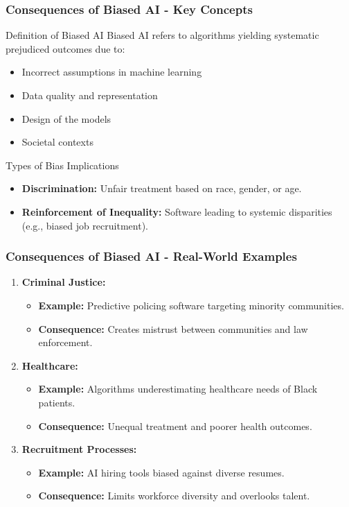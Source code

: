 \documentclass[aspectratio=169]{beamer}
\begin{document}
\begin{frame}[fragile]
    \frametitle{Consequences of Biased AI - Key Concepts}
    \begin{block}{Definition of Biased AI}
        Biased AI refers to algorithms yielding systematic prejudiced outcomes due to:
        \begin{itemize}
            \item Incorrect assumptions in machine learning
            \item Data quality and representation
            \item Design of the models
            \item Societal contexts
        \end{itemize}
    \end{block}
    
    \begin{block}{Types of Bias Implications}
        \begin{itemize}
            \item \textbf{Discrimination:} Unfair treatment based on race, gender, or age.
            \item \textbf{Reinforcement of Inequality:} Software leading to systemic disparities (e.g., biased job recruitment).
        \end{itemize}
    \end{block}
\end{frame}

\begin{frame}[fragile]
    \frametitle{Consequences of Biased AI - Real-World Examples}
    \begin{enumerate}
        \item \textbf{Criminal Justice:}
            \begin{itemize}
                \item \textbf{Example:} Predictive policing software targeting minority communities.
                \item \textbf{Consequence:} Creates mistrust between communities and law enforcement.
            \end{itemize}
        \item \textbf{Healthcare:}
            \begin{itemize}
                \item \textbf{Example:} Algorithms underestimating healthcare needs of Black patients.
                \item \textbf{Consequence:} Unequal treatment and poorer health outcomes.
            \end{itemize}
        \item \textbf{Recruitment Processes:}
            \begin{itemize}
                \item \textbf{Example:} AI hiring tools biased against diverse resumes.
                \item \textbf{Consequence:} Limits workforce diversity and overlooks talent.
            \end{itemize}
    \end{enumerate}
\end{frame}
\end{document}
